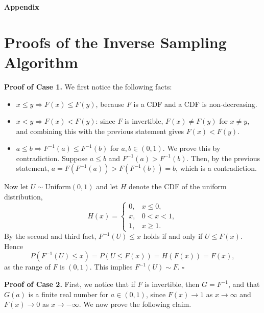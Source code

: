 \documentclass[12pt,a4paper]{article}
\begin{document}
\clearpage
{\appendixfont
\setcounter{section}{0}
\renewcommand{\thesection}{\Roman{section}.}
\titleformat{\section}{\fontsize{16}{19}\selectfont\bfseries}{\thesection}{0.6em}{}

{\fontsize{16}{19}\selectfont\bfseries Appendix\par}
\vspace{4pt}

\section{Proofs of the Inverse Sampling Algorithm}

\textbf{Proof of Case 1.} We first notice the following facts:
\begin{itemize}
\item $x \le y \Rightarrow F(x) \le F(y)$, because $F$ is a CDF and a CDF is non-decreasing.
\item $x < y \Rightarrow F(x) < F(y)$: since $F$ is invertible, $F(x) \ne F(y)$ for $x \ne y$, and combining this with the previous statement gives $F(x) < F(y)$.
\item $a \le b \Rightarrow F^{-1}(a) \le F^{-1}(b)$ for $a, b \in (0,1)$. We prove this by contradiction. Suppose $a \le b$ and $F^{-1}(a) > F^{-1}(b)$. Then, by the previous statement, $a = F(F^{-1}(a)) > F(F^{-1}(b)) = b$, which is a contradiction.
\end{itemize}
Now let $U \sim \text{Uniform}(0,1)$ and let $H$ denote the CDF of the uniform distribution,
\[
H(x) = \begin{cases} 0, & x \le 0,\\ x, & 0 < x < 1,\\ 1, & x \ge 1.\end{cases}
\]
By the second and third fact, $F^{-1}(U) \le x$ holds if and only if $U \le F(x)$. Hence
\[
P\left(F^{-1}(U) \le x\right) = P\left(U \le F(x)\right) = H\left(F(x)\right) = F(x),
\]
as the range of $F$ is $(0,1)$. This implies $F^{-1}(U) \sim F$. \hfill$\square$

\textbf{Proof of Case 2.} First, we notice that if $F$ is invertible, then $G = F^{-1}$, and that $G(a)$ is a finite real number for $a \in (0,1)$, since $F(x) \to 1$ as $x \to \infty$ and $F(x) \to 0$ as $x \to -\infty$. We now prove the following claim.

}
\end{document}
